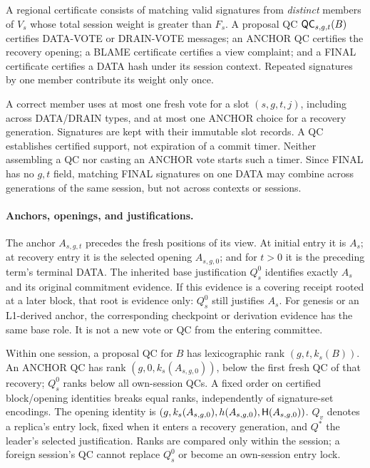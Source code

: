 \begin{definition}
\label{def:regional-certificate}
A regional certificate consists of matching valid signatures from
\emph{distinct} members of $V_s$ whose total session weight is greater
than $F_s$. A proposal QC $\mathsf{QC}_{s,g,t}(B)$ certifies DATA-VOTE or
DRAIN-VOTE messages; an ANCHOR QC certifies the recovery opening; a BLAME
certificate certifies a view complaint; and a FINAL certificate
certifies a DATA hash under its session context. Repeated signatures by
one member contribute its weight only once.
\end{definition}
A correct member uses at most one fresh vote for a slot $(s,g,t,j)$,
including across DATA/DRAIN types, and at most one ANCHOR choice for a
recovery generation. Signatures are kept with their immutable slot
records. A QC establishes certified support, not expiration of a commit
timer. Neither assembling a QC nor casting an ANCHOR vote starts such a
timer. Since FINAL has no $g,t$ field, matching FINAL signatures on one
DATA may combine across generations of the same session, but not across
contexts or sessions.

\paragraph{Anchors, openings, and justifications.}
The anchor $A_{s,g,t}$ precedes the fresh positions of its view. At
initial entry it is $A_s$; at recovery entry it is the selected opening
$A_{s,g,0}$; and for $t>0$ it is the preceding term's terminal DATA.
The inherited base justification $Q_s^0$ identifies exactly $A_s$ and
its original commitment evidence. If this evidence is a covering
receipt rooted at a later block, that root is evidence only: $Q_s^0$
still justifies $A_s$. For genesis or an L1-derived anchor, the
corresponding checkpoint or derivation evidence has the same base role.
It is not a new vote or QC from the entering committee.

Within one session, a proposal QC for $B$ has lexicographic rank
$(g,t,k_s(B))$. An ANCHOR QC has rank $(g,0,k_s(A_{s,g,0}))$, below the
first fresh QC of that recovery; $Q_s^0$ ranks below all own-session
QCs. A fixed order on certified block/opening identities breaks equal
ranks, independently of signature-set encodings. The opening identity
is $(g,k_s(A_{s,g,0}),h(A_{s,g,0}),\mathsf H(A_{s,g,0}))$.
$Q_v$ denotes a replica's entry lock, fixed when it enters a recovery
generation, and $Q^*$ the leader's selected justification. Ranks are
compared only within the session; a foreign session's QC cannot replace
$Q_s^0$ or become an own-session entry lock.

